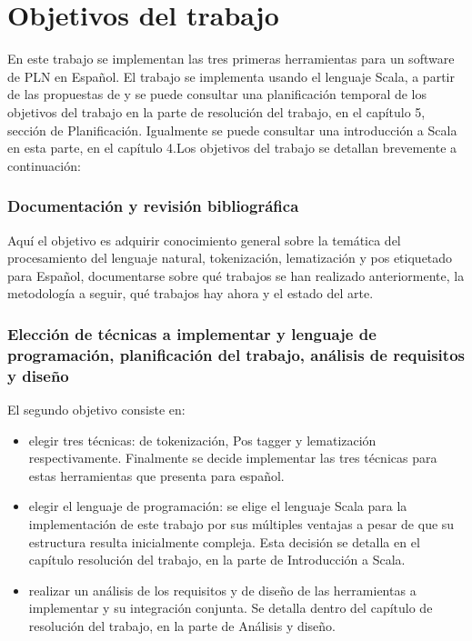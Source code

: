 
\chapter{Objetivos del trabajo}
En este trabajo se implementan las tres primeras herramientas para un software de PLN en Español. El trabajo se implementa usando el lenguaje \textcolor{SchoolColor}{Scala}, a partir de las propuestas de \citet{smedt2012pattern} y se puede consultar una planificación temporal de los objetivos del trabajo en la parte de \textsf{resolución del trabajo}, en el capítulo 5, sección de Planificación. Igualmente se puede consultar una introducción a \textcolor{SchoolColor}{Scala} en esta parte, en el capítulo 4.\newline Los objetivos del trabajo se detallan brevemente a continuación: 
\subsection*{Documentación y revisión bibliográfica}
Aquí el objetivo es adquirir conocimiento general sobre la temática del procesamiento del lenguaje natural, tokenización, lematización y pos etiquetado para Español, documentarse sobre qué trabajos se han realizado anteriormente, la metodología a seguir, qué trabajos hay ahora y el estado del arte. 
\subsection*{Elección de técnicas a implementar y lenguaje de programación, planificación del trabajo, análisis de requisitos y diseño}
El segundo objetivo consiste en:
\begin{itemize}
\item elegir tres técnicas: de tokenización, Pos tagger y lematización respectivamente. Finalmente se decide implementar las tres técnicas para estas herramientas que presenta \citet{smedt2012pattern} para español.
\item elegir el lenguaje de programación: se elige el lenguaje Scala para la implementación de este trabajo por sus múltiples ventajas a pesar de que su estructura resulta inicialmente compleja. Esta decisión se detalla en el capítulo resolución del trabajo, en la parte de Introducción a Scala.
\item realizar un análisis de los requisitos y de diseño de las herramientas a implementar y su integración conjunta. Se detalla dentro del capítulo de resolución del trabajo, en la parte de Análisis y diseño.
\end{itemize}

